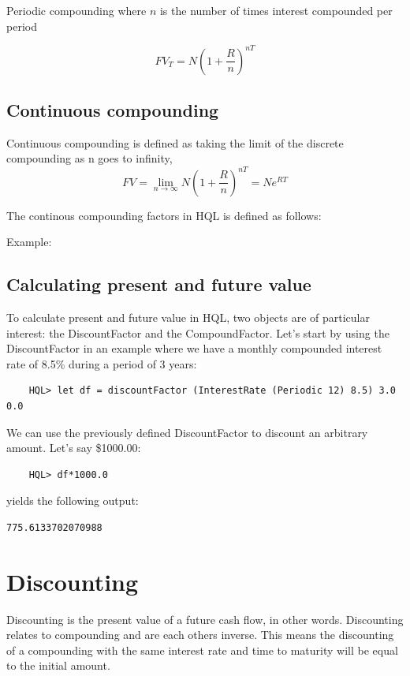 \documentclass[11pt,a4paper]{article}
\numberwithin{equation}{section}
\begin{document}
	Periodic compounding where $n$ is the number of times interest compounded per period

	\[ 
	FV_T=N\left( 1 + \frac{R}{n}  \right)^{nT}
	\]

	\subsection{Continuous compounding}
	Continuous compounding is defined as taking the limit of the discrete compounding as n goes to infinity,
	\[ 
	FV=\lim_{n \to \infty} N \left(1+\frac{R}{n}\right)^{nT}=Ne^{RT}
	\]

	The continous compounding factors in HQL is defined as follows:

	Example:

	\subsection{Calculating present and future value}


	To calculate present and future value in HQL, two objects are of particular interest:
	the DiscountFactor and the CompoundFactor. Let's start by using the DiscountFactor in an example
	where we have a monthly compounded interest rate of 8.5\% during a period of 3 years:
	\FrameSep
	\begin{lstlisting}
	HQL> let df = discountFactor (InterestRate (Periodic 12) 8.5) 3.0 0.0
	\end{lstlisting}
	We can use the previously defined DiscountFactor to discount an arbitrary amount. Let's say
	\$1000.00:
	\FrameSep
	\begin{lstlisting}
	HQL> df*1000.0
	\end{lstlisting}
	yields the following output:
	\FrameSep
	\begin{lstlisting}[style=Output]
	775.6133702070988
	\end{lstlisting}



	\section{Discounting}
	Discounting is the present value of a future cash flow, in other words. Discounting relates to compounding and are each others inverse. This means
	the discounting of a compounding with the same interest rate and time to maturity will be equal to the initial amount.
\end{document}
